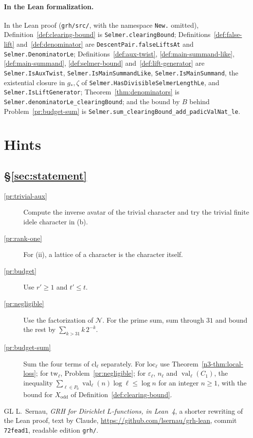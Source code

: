 \documentclass[reqno]{amsart}
\theoremstyle{definition}
\theoremstyle{plain}
\newcommand{\val}{\operatorname{val}}
\newcommand{\cl}{\mathrm{cl}}
\newcommand{\loc}{\mathrm{loc}}
\begin{document}
\paragraph{In the Lean formalization.}
In the Lean proof \cite{GL} (\nolinkurl{grh/src/}, with the namespace \texttt{New.} omitted), Definition~\ref{def:clearing-bound} is \texttt{Selmer.clearingBound}; Definitions~\ref{def:false-lift} and~\ref{def:denominator} are \texttt{DescentPair.falseLiftsAt} and \texttt{Selmer.DenominatorLe}; Definitions~\ref{def:aux-twist}, \ref{def:main-summand-like}, \ref{def:main-summand}, \ref{def:selmer-bound} and~\ref{def:lift-generator} are \texttt{Selmer.IsAuxTwist}, \texttt{Selmer.IsMainSummandLike}, \texttt{Selmer.IsMainSummand}, the existential closure in \(g_*, \zeta\) of \texttt{Selmer.HasDivisibleSelmerLengthLe}, and \texttt{Selmer.IsLiftGenerator}; Theorem~\ref{thm:denominators} is \texttt{Selmer.denominatorLe\_clearingBound}; and the bound by \(B\) behind Problem~\ref{pr:budget-sum} is \texttt{Selmer.sum\_clearingBound\_add\_padicValNat\_le}.

\section*{Hints}

\subsection*{\S\ref{sec:statement}}
\begin{description}
\item[\ref{pr:trivial-aux}] Compute the inverse avatar of the trivial character and try the trivial finite idele character in (b).
\item[\ref{pr:rank-one}] For (ii), a lattice of a character is the character itself.
\item[\ref{pr:budget}] Use \(r' \ge 1\) and \(t' \le t\).
\item[\ref{pr:negligible}] Use the factorization of \(\mathcal N\).  For the prime sum, sum through \(31\) and bound the rest by \(\sum_{k > 31} k\,2^{-k}\).
\item[\ref{pr:budget-sum}] Sum the four terms of \(\cl_\ell\) separately.  For \(\loc_\ell\) use Theorem~\ref{n3-thm:local-loss}; for \(\mathrm{tw}_\ell\), Problem~\ref{pr:negligible}; for \(\varepsilon_\ell\), \(n_\ell\) and \(\val_\ell(C_1)\), the inequality \(\sum_{\ell \in P_0} \val_\ell(n)\log\ell \le \log n\) for an integer \(n \ge 1\), with the bound for \(X_{\mathrm{odd}}\) of Definition~\ref{def:clearing-bound}.
\end{description}

\begin{thebibliography}{GL}
 L.~Sernau, \emph{GRH for Dirichlet \(L\)-functions, in Lean~4}, a shorter rewriting of the Lean proof, text by Claude, \url{https://github.com/lsernau/grh-lean}, commit \texttt{72fead1}, readable edition \texttt{grh/}.
\end{thebibliography}
\end{document}
